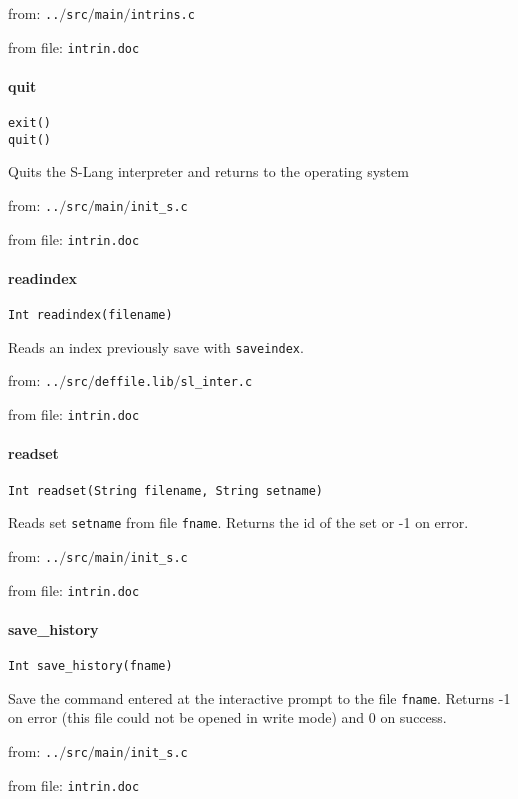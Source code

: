 from: {\tt ..$/$src$/$main$/$intrins.c}

from file: {\tt intrin.doc}


\paragraph{quit}
\begin{verbatim}
exit()
quit()
\end{verbatim}
Quits the S-Lang interpreter and returns to the
operating system 


from: {\tt ..$/$src$/$main$/$init\_s.c}

from file: {\tt intrin.doc}


\paragraph{readindex}
\begin{verbatim}
Int readindex(filename)
\end{verbatim}
Reads an index previously save with {\tt saveindex}.


from: {\tt ..$/$src$/$deffile.lib$/$sl\_inter.c}

from file: {\tt intrin.doc}


\paragraph{readset}
\begin{verbatim}
Int readset(String filename, String setname)
\end{verbatim}
Reads set {\tt setname} from file {\tt fname}. Returns the
id of the set or -1 on error.


from: {\tt ..$/$src$/$main$/$init\_s.c}

from file: {\tt intrin.doc}


\paragraph{save\_history}
\begin{verbatim}
Int save_history(fname)
\end{verbatim}
Save the command entered at the interactive prompt to the
file {\tt fname}. Returns -1 on error (this file could not be
opened in write mode) and 0 on success.


from: {\tt ..$/$src$/$main$/$init\_s.c}

from file: {\tt intrin.doc}



